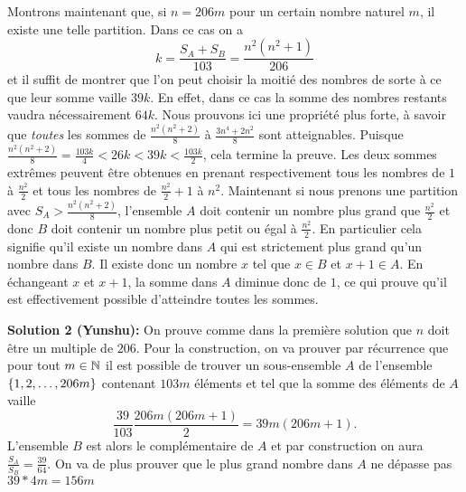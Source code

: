 \documentclass[language=german,style=solution]{smo}
\begin{document}
\begin{enumerate}
Montrons maintenant que, si $n = 206 m$ pour un certain nombre naturel $m$, il existe une telle partition. Dans ce cas on a
\[
	k = \frac{S_A+S_B}{103} = \frac{n^2(n^2+1)}{206}
\]
et il suffit de montrer que l'on peut choisir la moitié des nombres de sorte à ce que leur somme vaille $39k$. En effet, dans ce cas la somme des nombres restants vaudra nécessairement $64k$. Nous prouvons ici une propriété plus forte, à savoir que \emph{toutes} les sommes de $\frac{n^2(n^2+2)}{8}$ à $\frac{3n^4+2n^2}{8}$ sont atteignables. Puisque $\frac{n^2(n^2+2)}{8} = \frac{103k}{4} < 26k < 39k < \frac{103k}{2}$, cela termine la preuve. Les deux sommes extrêmes peuvent être obtenues en prenant respectivement tous les nombres de $1$ à $\frac{n^2}{2}$ et tous les nombres de $\frac{n^2}{2}+1$ à $n^2$. Maintenant si nous prenons une partition avec $S_A > \frac{n^2(n^2+2)}{8}$, l'ensemble $A$ doit contenir un nombre plus grand que $\frac{n^2}{2}$ et donc $B$ doit contenir un nombre plus petit ou égal à $\frac{n^2}{2}$. En particulier cela signifie qu'il existe un nombre dans $A$ qui est strictement plus grand qu'un nombre dans $B$. Il existe donc un nombre $x$ tel que $x\in B$ et $x+1\in A$. En échangeant $x$ et $x+1$, la somme dans $A$ diminue donc de $1$, ce qui prouve qu'il est effectivement possible d'atteindre toutes les sommes.

\textbf{Solution 2 (Yunshu):}
On prouve comme dans la première solution que $n$ doit être un multiple de $206$. Pour la construction, on va prouver par récurrence que pour tout $m\in \mathbb{N}$ il est possible de trouver un sous-ensemble $A$ de l'ensemble $\{1, 2, \ldots, 206m\}$ contenant $103m$ éléments et tel que la somme des éléments de $A$ vaille
\[
	\frac{39}{103}\frac{206m(206m + 1)}{2} = 39m(206m + 1).
\]
L'ensemble $B$ est alors le complémentaire de $A$ et par construction on aura $\frac{S_A}{S_B} = \frac{39}{64}$. On va de plus prouver que le plus grand nombre dans $A$ ne dépasse pas $39*4m = 156m$


\end{enumerate}
\end{document}
